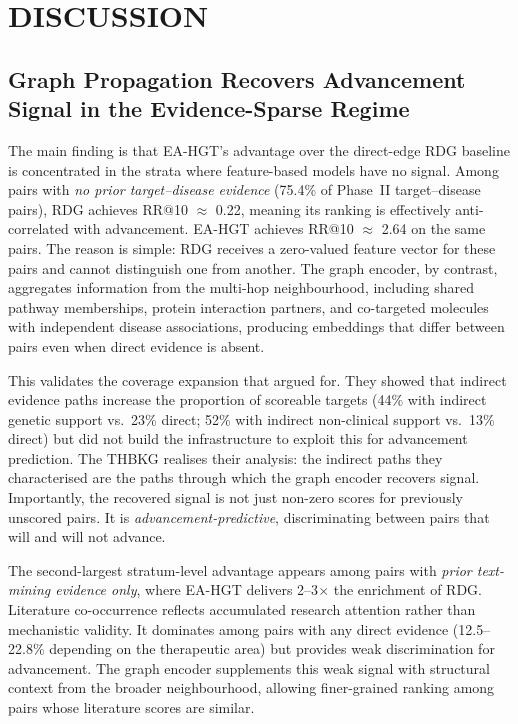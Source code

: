 \documentclass[a4,center]{NAR}
\newcommand{\eahgt}{\textsc{EA-HGT}}
\begin{document}
{%
\section{DISCUSSION}

\subsection{Graph Propagation Recovers Advancement Signal in the Evidence-Sparse Regime}
\label{sec:discussion_sparse_recovery}

The main finding is that \eahgt{}'s advantage over the direct-edge RDG
baseline is concentrated in the strata where feature-based models have
no signal. Among pairs with \emph{no prior target--disease evidence}
(75.4\% of Phase~II target--disease pairs), RDG achieves RR@10
$\approx$ 0.22, meaning its
ranking is effectively anti-correlated with advancement. \eahgt{}
achieves RR@10 $\approx$ 2.64 on the same pairs. The reason is simple:
RDG receives a zero-valued feature vector for these pairs and cannot
distinguish one from another. The graph encoder, by contrast, aggregates
information from the multi-hop neighbourhood, including shared pathway
memberships, protein interaction partners, and co-targeted molecules with
independent disease associations, producing embeddings that differ between
pairs even when direct evidence is absent.

This validates the coverage expansion that \citet{Falaguera2025TemporalDiscovery}
argued for. They showed that indirect evidence paths increase the
proportion of scoreable targets (44\% with indirect genetic support
vs.\ 23\% direct; 52\% with indirect non-clinical support vs.\ 13\%
direct) but did not build the infrastructure to exploit this for
advancement prediction. The THBKG realises their analysis: the indirect
paths they characterised are the paths through which the graph encoder
recovers signal. Importantly, the recovered signal is not just non-zero
scores for previously unscored pairs. It is \emph{advancement-predictive},
discriminating between pairs that will and will not advance.

The second-largest stratum-level advantage appears among pairs with
\emph{prior text-mining evidence only}, where \eahgt{} delivers
2--3$\times$ the enrichment of RDG. Literature co-occurrence reflects accumulated
research attention rather than mechanistic validity. It dominates among
pairs with any direct evidence (12.5--22.8\% depending on the therapeutic
area) but provides weak discrimination for advancement. The graph encoder
supplements this weak signal with structural context from the broader
neighbourhood, allowing finer-grained ranking among pairs whose literature
scores are similar.

}
\end{document}
